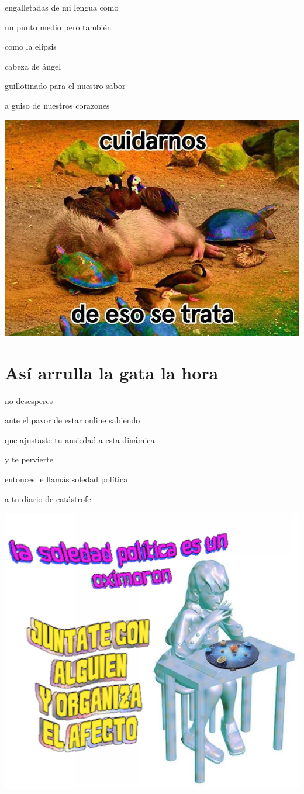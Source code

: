\documentclass[
]{book}
\begin{document}
engalletadas de mi lengua como

un punto medio pero también

como la elipsis

cabeza de ángel

guillotinado para el nuestro sabor

a guiso de nuestros corazones

\includegraphics{images/2.png}

\hypertarget{asuxed-arrulla-la-gata-la-hora}{%
\chapter{Así arrulla la gata la hora}\label{asuxed-arrulla-la-gata-la-hora}}

no desesperes

ante el pavor de estar online sabiendo

que ajustaste tu ansiedad a esta dinámica

y te pervierte

entonces le llamás soledad política

a tu diario de catástrofe

\includegraphics{images/3.png}
\end{document}
